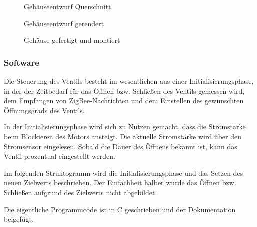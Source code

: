 \begin{figure}[H]
\centering
{}
\caption{Gehäuseentwurf Querschnitt}
\label{fig:Geh1}
\end{figure}


\begin{figure}[H]
\centering
{}
\caption{Gehäuseentwurf gerendert}
\label{fig:Geh2}
\end{figure}


\begin{figure}[H]
\centering
{}
\caption{Gehäuse gefertigt und montiert}
\label{fig:Geh3}
\end{figure}




\subsubsection{Software}\label{Ventil_SW}
Die Steuerung des Ventils besteht im wesentlichen aus einer Initialisierungsphase, in der der Zeitbedarf für das Öffnen bzw. Schließen des Ventils gemessen wird, dem Empfangen von ZigBee-Nachrichten und dem Einstellen des gewünschten Öffnungsgrads des Ventils.

In der Initialisierungsphase wird sich zu Nutzen gemacht, dass die Stromstärke beim Blockieren des Motors ansteigt. Die aktuelle Stromstärke wird über den Stromsensor eingelesen. Sobald die Dauer des Öffnens bekannt ist, kann das Ventil prozentual eingestellt werden.

Im folgenden Struktogramm wird die Initialisierungsphase und das Setzen des neuen Zielwerts beschrieben. Der Einfachheit halber wurde das Öffnen bzw. Schließen aufgrund des Zielwerts nicht abgebildet.

Die eigentliche Programmcode ist in C geschrieben und der Dokumentation beigefügt.

